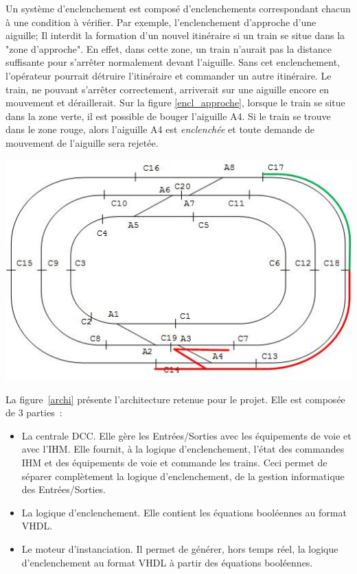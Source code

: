 \medskip
Un système d'enclenchement est composé d'enclenchements correspondant
chacun à une condition à vérifier. Par exemple, l'{enclenchement
d'approche d'une aiguille}; Il interdit la formation d'un 
nouvel itinéraire si un train se situe dans la "zone d'approche".
En effet, dans cette zone, un train
n'aurait pas la distance suffisante pour s'arrêter normalement devant
l'aiguille.  Sans cet enclenchement, l'opérateur pourrait détruire
l'itinéraire et commander un autre itinéraire. Le train, ne pouvant
s'arrêter correctement, arriverait sur une aiguille encore en
mouvement et déraillerait.
Sur la figure \ref{encl_approche}, lorsque le train se situe dans la
zone verte, il est possible de bouger l'aiguille A4. Si le train se
trouve dans le zone rouge, alors l'aiguille A4 est \emph{enclenchée}
et toute demande de mouvement de l'aiguille sera rejetée.


\begin{center}
\includegraphics[scale=0.6]{zone_approche.jpg}
\label{encl_approche}%
\end{center}

\newpage
  
La figure~\ref{archi} présente l'architecture retenue pour le
projet. Elle est composée de 3 parties~:
  \begin{itemize}
    \item La centrale DCC. Elle gère les Entrées/Sorties avec les
      équipements de voie et avec l'IHM. Elle fournit, à la logique
      d'enclenchement, l'état des commandes IHM et des équipements de
      voie et commande les trains. Ceci permet de séparer complètement
      la logique d'enclenchement, de la gestion informatique des
      Entrées/Sorties.
    \item La logique d'enclenchement. Elle contient les équations
      booléennes au format VHDL. 
    \item Le moteur d'instanciation. Il permet de générer, hors temps réel,
      la logique d'enclenchement au format VHDL à partir des équations
      booléennes.
  \end{itemize}

